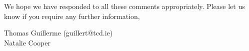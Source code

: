 \documentclass[12pt,letterpaper]{article}
\begin{document}
We hope we have responded to all these comments appropriately. Please let us know if you require any further information,\\
\bigskip



Thomas Guillerme (guillert@tcd.ie)\\ %
Natalie Cooper
\end{document}
